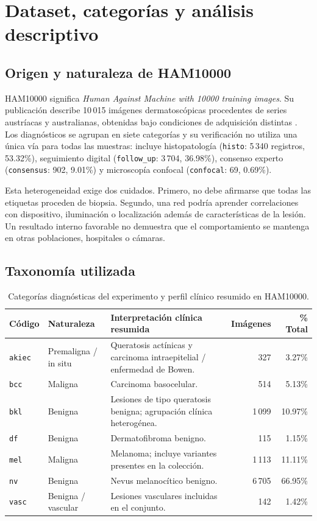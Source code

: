 \FloatBarrier\section{Dataset, categorías y análisis descriptivo}

\subsection{Origen y naturaleza de HAM10000}
HAM10000 significa \textit{Human Against Machine with 10000 training images}. Su publicación describe 10\,015 imágenes dermatoscópicas procedentes de series austríacas y australianas, obtenidas bajo condiciones de adquisición distintas \cite{tschandl2018,codella2019}. Los diagnósticos se agrupan en siete categorías y su verificación no utiliza una única vía para todas las muestras: incluye histopatología (\texttt{histo}: 5\,340 registros, 53.32\%), seguimiento digital (\texttt{follow\_up}: 3\,704, 36.98\%), consenso experto (\texttt{consensus}: 902, 9.01\%) y microscopía confocal (\texttt{confocal}: 69, 0.69\%).

Esta heterogeneidad exige dos cuidados. Primero, no debe afirmarse que todas las etiquetas proceden de biopsia. Segundo, una red podría aprender correlaciones con dispositivo, iluminación o localización además de características de la lesión. Un resultado interno favorable no demuestra que el comportamiento se mantenga en otras poblaciones, hospitales o cámaras.

\subsection{Taxonomía utilizada}
\begin{table}[htbp]\centering\small
\caption{Categorías diagnósticas del experimento y perfil clínico resumido en HAM10000.}
\begin{tabularx}{\textwidth}{@{}ll>{\raggedright\arraybackslash}Xrr@{}}
\toprule
\textbf{Código} & \textbf{Naturaleza} & \textbf{Interpretación clínica resumida} & \textbf{Imágenes} & \textbf{\% Total} \\ \midrule
\texttt{akiec} & Premaligna / in situ & Queratosis actínicas y carcinoma intraepitelial / enfermedad de Bowen. & 327 & 3.27\% \\
\texttt{bcc} & Maligna & Carcinoma basocelular. & 514 & 5.13\% \\
\texttt{bkl} & Benigna & Lesiones de tipo queratosis benigna; agrupación clínica heterogénea. & 1\,099 & 10.97\% \\
\texttt{df} & Benigna & Dermatofibroma benigno. & 115 & 1.15\% \\
\texttt{mel} & Maligna & Melanoma; incluye variantes presentes en la colección. & 1\,113 & 11.11\% \\
\texttt{nv} & Benigna & Nevus melanocítico benigno. & 6\,705 & 66.95\% \\
\texttt{vasc} & Benigna / vascular & Lesiones vasculares incluidas en el conjunto. & 142 & 1.42\% \\
\bottomrule
\end{tabularx}
\end{table}

